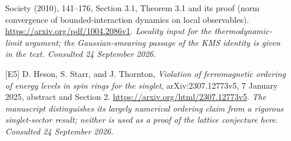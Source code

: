 \documentclass[11pt]{article}
\begin{document}
\begin{itemize}
		Society (2010), 141--176, Section 3.1, Theorem 3.1 and its proof
		(norm convergence of bounded-interaction dynamics on local observables).
		\url{https://arxiv.org/pdf/1004.2086v1}.
		{\small\textit{Locality input for the thermodynamic-limit argument;
				the Gaussian-smearing passage of the KMS identity is given in the text.
				Consulted 24 September 2026.}}
		\item[\textnormal{[E5]}]\hypertarget{extra:statement:5}{}
		D. Heson, S. Starr, and J. Thornton, \emph{Violation of ferromagnetic
			ordering of energy levels in spin rings for the singlet},
		arXiv:2307.12773v5, 7 January 2025, abstract and Section 2.
		\url{https://arxiv.org/html/2307.12773v5}.
		{\small\textit{The manuscript distinguishes its largely numerical
				ordering claim from a rigorous singlet-sector result; neither is
				used as a proof of the lattice conjecture here. Consulted
				24 September 2026.}}
	\end{itemize}
\end{document}
